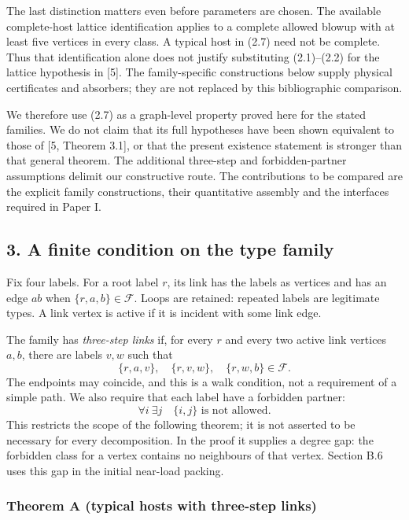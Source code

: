 \documentclass[english,11pt,a4paper]{article}
\begin{document}
The last distinction matters even before parameters are chosen. The available complete-host lattice identification applies to a complete allowed blowup with at least five vertices in every class. A typical host in (2.7) need not be complete. Thus that identification alone does not justify substituting (2.1)--(2.2) for the lattice hypothesis in {[}5{]}. The family-specific constructions below supply physical certificates and absorbers; they are not replaced by this bibliographic comparison.

We therefore use (2.7) as a graph-level property proved here for the stated families. We do not claim that its full hypotheses have been shown equivalent to those of {[}5, Theorem 3.1{]}, or that the present existence statement is stronger than that general theorem. The additional three-step and forbidden-partner assumptions delimit our constructive route. The contributions to be compared are the explicit family constructions, their quantitative assembly and the interfaces required in Paper I.


\subsection{3. A finite condition on the type family}\label{a-finite-condition-on-the-type-family}

Fix four labels. For a root label \(r\), its link has the labels as vertices and has an edge \(ab\) when \(\{r,a,b\}\in\mathcal F\). Loops are retained: repeated labels are legitimate types. A link vertex is active if it is incident with some link edge.

The family has \emph{three-step links} if, for every \(r\) and every two active link vertices \(a,b\), there are labels \(v,w\) such that \[\{r,a,v\},\quad\{r,v,w\},\quad\{r,w,b\}\in\mathcal F.
\tag{3.1}\] The endpoints may coincide, and this is a walk condition, not a requirement of a simple path. We also require that each label have a forbidden partner: \[\forall i\ \exists j\quad\{i,j\}\text{ is not allowed}.
\tag{3.2}\] This restricts the scope of the following theorem; it is not asserted to be necessary for every decomposition. In the proof it supplies a degree gap: the forbidden class for a vertex contains no neighbours of that vertex. Section B.6 uses this gap in the initial near-load packing.

\subsubsection{Theorem A (typical hosts with three-step links)}\label{theorem-a-typical-hosts-with-three-step-links}
\end{document}
